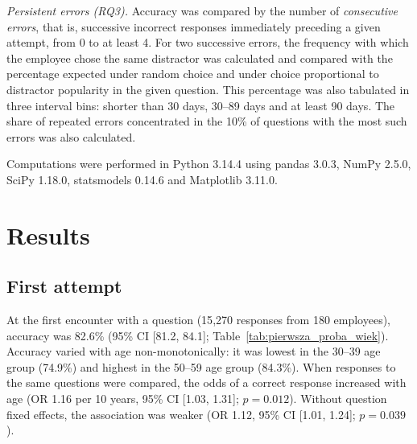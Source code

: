 \documentclass[11pt]{article}
\newcommand{\NEmployees}{180}
\newcommand{\RunMax}{4}
\newcommand{\FirstN}{15{,}270}
\newcommand{\FirstAcc}{82.6}
\newcommand{\FirstAccCI}{[81.2, 84.1]}
\newcommand{\FirstAccMinGroup}{30--39}
\newcommand{\FirstAccMin}{74.9}
\newcommand{\FirstAccMaxGroup}{50--59}
\newcommand{\FirstAccMax}{84.3}
\newcommand{\FirstAgeOR}{1.16}
\newcommand{\FirstAgeORCI}{[1.03, 1.31]}
\newcommand{\FirstAgeP}{= 0.012}
\newcommand{\FirstAgeRawOR}{1.12}
\newcommand{\FirstAgeRawORCI}{[1.01, 1.24]}
\newcommand{\FirstAgeRawP}{= 0.039}
\newcommand{\VerPython}{3.14.4}
\newcommand{\VerPandas}{3.0.3}
\newcommand{\VerNumpy}{2.5.0}
\newcommand{\VerScipy}{1.18.0}
\newcommand{\VerStatsmodels}{0.14.6}
\newcommand{\VerMatplotlib}{3.11.0}
\begin{document}
\emph{Persistent errors (RQ3).} Accuracy was compared by the number of \emph{consecutive errors}, that
is, successive incorrect responses immediately preceding a given attempt, from 0 to at least \RunMax.
For two successive errors, the frequency with which the employee chose the same distractor was
calculated and compared with the percentage expected under random choice and under choice
proportional to distractor popularity in the given question. This percentage was also tabulated in
three interval bins: shorter than 30 days, 30--89 days and at least 90 days. The share of repeated
errors concentrated in the 10\% of questions with the most such errors was also calculated.

Computations were performed in Python \VerPython{} using pandas \VerPandas, NumPy \VerNumpy, SciPy
\VerScipy, statsmodels \VerStatsmodels{} and Matplotlib \VerMatplotlib.
\section{Results}

\subsection{First attempt}
At the first encounter with a question (\FirstN{} responses from \NEmployees{} employees), accuracy
was \FirstAcc\% (95\% CI \FirstAccCI; Table~\ref{tab:pierwsza_proba_wiek}). Accuracy varied with age
non-monotonically: it was lowest in the \FirstAccMinGroup{} age group (\FirstAccMin\%) and highest in
the \FirstAccMaxGroup{} age group (\FirstAccMax\%). When responses to the same questions were
compared, the odds of a correct response increased with age (OR \FirstAgeOR{} per 10 years, 95\% CI
\FirstAgeORCI; $p \FirstAgeP$). Without question fixed effects, the association was weaker
(OR \FirstAgeRawOR, 95\% CI \FirstAgeRawORCI; $p \FirstAgeRawP$).
\end{document}
